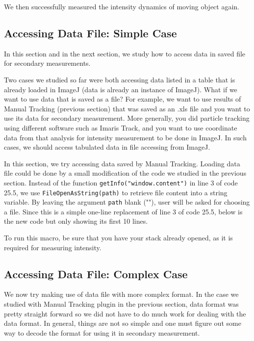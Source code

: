 \documentclass[11pt,a4paper,oneside]{report}
\newcommand{\ilcom}[1]{\texttt{\small#1}}
\begin{document}
We then successfully measured the intensity dynamics of moving object again.  

\newpage
\subsection{Accessing Data File: Simple Case}
In this section and in the next section, 
we study how to access data in saved file for secondary measurements. 

Two cases we studied so far were both accessing data listed in a table that is already loaded in ImageJ 
(data is already an instance of ImageJ). What if we want to use data that is saved as a file? For example, 
we want to use results of Manual Tracking (previous section) that was saved as an .xls file and 
you want to use its data for secondary measurement. More generally, you did particle tracking using different software 
such as Imaris Track, and you want to use  coordinate data from that analysis for intensity measurement to be done in ImageJ. 
In such cases, we should access tabulated data in file accessing from ImageJ. 

In this section, we try accessing data saved by Manual Tracking. 
Loading data file could be done by a small modification 
of the code we studied in the previous section. Instead of the function 
\ilcom{getInfo("window.content")} in line 3 of code 25.5, we use \ilcom{FileOpenAsString(path)} to retrieve 
file content into a string variable.  By leaving the argument \ilcom{path} blank (""), user will be asked for choosing a file. 
Since this is a simple one-line replacement of line 3 of code 25.5, below is the new code but only showing its first 10 lines.  



To run this macro, be sure that you have your stack already opened, as it is required for measuring intensity. 

\subsection{Accessing Data File: Complex Case}

We now try making use of data file with more complex format. 
In the case we studied with Manual Tracking plugin in the previous section, data format was pretty straight forward 
so we did not have to do much work for dealing with the data format. 
In general, things are not so simple and one must figure out some way to decode the format for using it in secondary measurement. 
\end{document}
